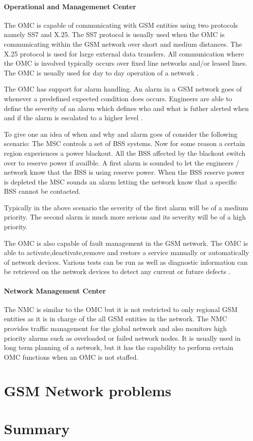 \paragraph{Operational and Managemenet Center}
The OMC is capable of communicating with GSM entities using two protocols namely SS7 and X.25. The SS7 protocol is usually used when the OMC is communicating within the GSM network over short and medium distances. The X.25 protocol is used for large external data transfers. All communication where the OMC is involved typically occurs over fixed line networks and/or leased lines. The OMC is usually used for day to day operation of a network \cite{GSMSysEngin}.

The OMC has support for alarm handling. An alarm in a GSM network goes of whenever a predefined expected condition does occurs. Engineers are able to define the severity of an alarm which defines who and what is futher alerted when and if the alarm is escalated to a higher level \cite{GSMSysEngin}.

To give one an idea of when and why and alarm goes of consider the following scenario: The MSC controls a set of BSS systems. Now for some reason a certain region experiences a power blackout. All the BSS affected by the blackout switch over to reserve power if availble. A first alarm is sounded to let the engineers / network know that the BSS is using reserve power. When the BSS reserve power is depleted the MSC sounds an alarm letting the network know that a specific BSS cannot be contacted.

Typically in the above scenario the severity of the first alarm will be of a medium priority. The second alarm is much more serious and its severity will be of a high priority.

The OMC is also capable of fault management in the GSM network. The OMC is able to activate,deactivate,remove and restore a service manually or automatically of network devices. Various tests can be run as well as diagnostic information can be retrieved on the network devices to detect any current or future defects \cite{GSMSysEngin}.

\paragraph{Network Management Center}
The NMC is similar to the OMC but it is not restricted to only regional GSM entities as it is in charge of the all GSM entities in the network. The NMC provides traffic management for the global network and also monitors high priority alarms such as overloaded or failed network nodes. It is usually used in long term planning of a network, but it has the capability to perform certain OMC functions when an OMC is not staffed. 

\section{GSM Network problems}
\section{Summary}

